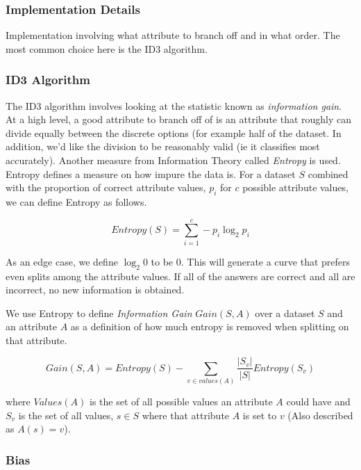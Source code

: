 \documentclass[titlepage,11pt]{article}
\begin{document}
\subsubsection{Implementation Details}

Implementation involving what attribute to branch off and in what order. The most common choice here is the ID3 algorithm.

\subsubsection*{ID3 Algorithm}

The ID3 algorithm involves looking at the statistic known as \textit{information gain}. At a high level, a good attribute to branch off of is an attribute that roughly can divide equally between the discrete options (for example half of the dataset. In addition, we'd like the division to be reasonably valid (ie it classifies most accurately). Another measure from Information Theory called \textit{Entropy} is used. Entropy defines a measure on how impure the data is. For a dataset $S$ combined with the proportion of correct attribute values, $p_i$ for $c$ possible attribute values, we can define Entropy as follows.

\begin{equation}
Entropy(S) = \sum_{i=1}^{c} -p_i \log_2 p_i
\end{equation}

As an edge case, we define $\log_2 0$ to be $0$. This will generate a curve that prefers even splits among the attribute values. If all of the answers are correct and all are incorrect, no new information is obtained.

We use Entropy to define \textit{Information Gain} $Gain(S, A)$ over a dataset $S$ and an attribute $A$ as a definition of how much entropy is removed when splitting on that attribute.

\begin{equation}
Gain(S,A) = Entropy(S) - \sum_{v \in values(A)} \frac{|S_v|}{|S|} Entropy(S_v)
\end{equation}

where $Values(A)$ is the set of all possible values an attribute $A$ could have and $S_v$ is the set of all values, $s \in S$ where that attribute $A$ is set to $v$ (Also described as $A(s) = v$).

\subsubsection*{Bias}
\end{document}
